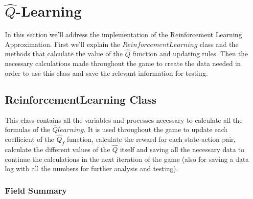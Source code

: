\newpage

\section{$ \hat{Q}$-Learning}

In this section we'll address the implementation of the Reinforcement Learning Approximation. First we'll explain the $ReinforcementLearning$ class and the methods that calculate the value of the $\hat{Q}$ function and updating rules. Then the necessary calculations made throughout the game to create the data needed in order to use this class and save the relevant information for testing.\nolinebreak

\subsection{ReinforcementLearning Class}

This class contains all the variables and processes necessary to calculate all the formulas of the $\hat{Q} learning$. It is used throughout the game to update each coefficient of the $\hat{Q}_f$ function, calculate the reward for each state-action pair, calculate the different values of the $\hat{Q}$ itself and saving all the necessary data to continue the calculations in the next iteration of the game (also for saving a data log with all the numbers for further analysis and testing).

\subsubsection{Field Summary}

